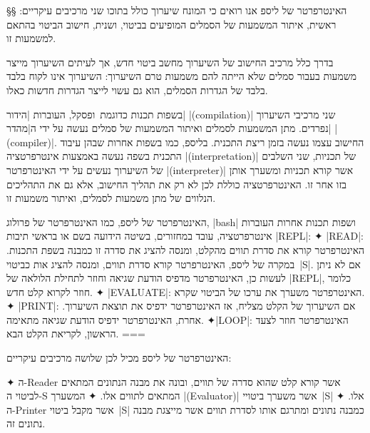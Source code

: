 §§ האינטרפרטר של ליספ
אנו רואים כי המונח שיערוך כולל בתוכו שני מרכיבים עיקריים: ראשית, איתור המשמעות
של הסמלים המופיעים בביטוי, ושנית, חישוב הביטוי בהתאם למשמעות זו.

בדרך כלל מרכיב החישוב של השיערוך מחשב ביטוי חדש, אך לעיתים השיערוך מייצר משמעות
בעבור סמלים שלא הייתה להם משמעות טרם השיערוך: השיערוך אינו לקוח בלבד
בלבד של הגדרות הסמלים, הוא גם עשוי לייצר הגדרות חדשות כאלו.

בשפות תכנות כדוגמת~\CPL ופסקל, העוברות \ע|הידור| \E|(compilation)| שני מרכיבי
השיערוך נפרדים. מתן המשמעות לסמלים ואיתור המשמעות של סמלים נעשה על ידי
ה\ע|מהדר| \E|(compiler)|. החישוב עצמו נעשה בזמן ריצת התכנית. בליספ, כמו בשפות
אחרות שבהן עיבוד התכנית בשפה נעשה באמצעות אינטרפרטציה \E|(interpretation)| של
תכניות, שני השלבים של השיערוך נעשים על ידי האינטרפרטר \E|(interpreter)| אשר
קורא תכניות ומשערך אותן בזו אחר זו. האינטרפרטציה כוללת לכן לא רק את תהליך החישוב,
אלא גם את התהליכים הנלווים של מתן משמעות לסמלים, ואיתור משמעות זו.

\begin{minipage}\linewidth
  \footnotesize
  \begin{mdframed}[backgroundcolor=Lavender!20]
    האינטרפרטר של ליספ, כמו האינטרפרטר של פרולוג, \E|bash| ושפות תכנות אחרות
    העוברות אינטרפרטציה, עובד במחזורים, בשיטה הידועה בשם
    או בראשי תיבות \E|REPL|:
    ✦ \E|READ|: האינטרפרטר קורא את סדרת תווים מהקלט, ומנסה להציג את סדרה זו
    כמבנה בשפת התכנות. במקרה של ליספ, האינטרפרטר קורא סדרת תווים, ומנסה להציג
    אות כביטוי~\E|S|. אם לא ניתן לעשות כן, האינטרפרטר מדפיס הודעת שגיאה וחוזר
    לתחילת הלולאה של \E|REPL|, כלומר חוזר לקרוא קלט חדש.
    ✦ \E|EVALUATE|: האינטרפרטר משערך את ערכו של הביטוי שקרא.
    ✦ \E|PRINT|: אם השיערוך של הקלט מצליח, אז האינטרפרטר ידפיס את תוצאת
    השיערוך. אחרת, האינטרפרטר ידפיס הודעת שגיאה מתאימה.
    ✦\E|LOOP|: האינטרפרטר חוזר לצעד הראשון, לקריאת הקלט הבא.
===
  \end{mdframed}
\end{minipage}

האינטרפרטר של ליספ מכיל לכן שלושה מרכיבים עיקריים:
\begin{enumerate}
  ✦ ה-Reader אשר קורא קלט שהוא סדרה של תווים, ובונה את מבנה הנתונים המתאים
  לביטוי ה-S המתאים לתווים אלו.
  ✦ המשערך \E|(Evaluator)| אשר משערך ביטויי~\E|S| אלו.
  ✦ ה-Printer אשר מקבל ביטוי~\E|S| כמבנה נתונים ומתרגם אותו לסדרת תווים אשר
  מייצגת מבנה נתונים זה.
\end{enumerate}

